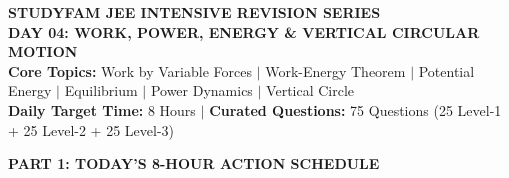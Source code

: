 \documentclass[11pt,a4paper]{article}
\begin{document}
\begin{tcolorbox}[dayheader]
\begin{center}
  {\Large \textbf{\textsf{\textcolor{goldAccent}{STUDYFAM JEE INTENSIVE REVISION SERIES}}}}\\[3pt]
  {\LARGE \textbf{\textsf{DAY 04: WORK, POWER, ENERGY \& VERTICAL CIRCULAR MOTION}}}\\[5pt]
  {\normalsize \textbf{\textsf{Core Topics:}} Work by Variable Forces $\vert$ Work-Energy Theorem $\vert$ Potential Energy $\vert$ Equilibrium $\vert$ Power Dynamics $\vert$ Vertical Circle}\\[3pt]
  {\footnotesize \textbf{Daily Target Time:} 8 Hours \quad $\vert$ \quad \textbf{Curated Questions:} 75 Questions (25 Level-1 + 25 Level-2 + 25 Level-3)}
\end{center}
\end{tcolorbox}

\vspace{6pt}

\begin{tcolorbox}[sectionbanner]
  {\large \textbf{\textsf{PART 1: TODAY'S 8-HOUR ACTION SCHEDULE}}}
\end{tcolorbox}
\vspace{2pt}
\end{document}
